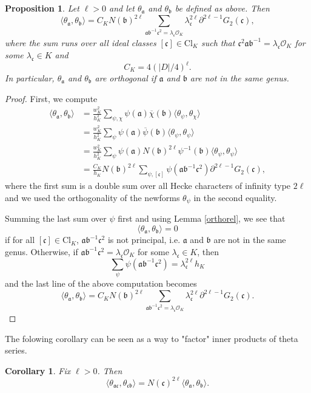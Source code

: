 \documentclass[twoside,10pt]{article}
\newtheorem{prop}{Proposition}
\newtheorem{coro}{Corollary}
\newcommand{\ida}{\mathfrak{a}}
\newcommand{\idb}{\mathfrak{b}}
\newcommand{\idc}{\mathfrak{c}}
\newcommand{\del}{\partial}
\newcommand{\Clk}{\text{Cl}_K}
\renewcommand{\O}{\mathcal{O}}
\newcommand{\tpsi}{\theta_\psi}
\begin{document}
\begin{prop}\label{formula:innerprod}
	Let $\ell>0$ and let $\theta_\ida$ and $\theta_\idb$ be defined as above. Then
	\[\langle\theta_\ida,\theta_\idb\rangle=C_K N(\idb)^{2\ell}\sum_{\ida\idb^{-1}\idc^2=\lambda_\idc\O_K}\lambda_\idc^{2\ell}\del^{2\ell-1}G_2(\idc),\]
	where the sum runs over all ideal classes $[\idc]\in\Clk$ such that $\idc^2\ida\idb^{-1}=\lambda_\idc\O_K$ for some $\lambda_\idc\in K$ and
	 \[C_K=4(|D|/4)^\ell.\]
	 In particular, $\theta_\ida$ and $\theta_\idb$ are orthogonal if $\ida$ and $\idb$ are not in the same genus.
\end{prop}
\begin{proof}
	First, we compute
	\begin{align*}
		\langle\theta_\ida,\theta_\idb\rangle &= \frac{w_K^2}{h_K^2}\sum_{\psi,\chi}\psi(\ida)\overline{\chi}(\idb)\langle\theta_\psi,\theta_\chi\rangle\\
		&= \frac{w_K^2}{h_K^2}\sum_{\psi}\psi(\ida)\overline{\psi}(\idb)\langle\theta_\psi,\theta_\psi\rangle\\
		&= \frac{w_K^2}{h_K^2}\sum_{\psi}\psi(\ida)N(\idb)^{2\ell}\psi^{-1}(\idb)\langle\theta_\psi,\theta_\psi\rangle\\
		&= \frac{C_K}{h_K}N(\idb)^{2\ell}\sum_{\psi,[\idc]}\psi(\ida\idb^{-1}\idc^2)\del^{2\ell-1}G_2(\idc),
	\end{align*}
	where the first sum is a double sum over all Hecke characters of infinity type $2\ell$ and we used the orthogonality of the newforms $\tpsi$ in the second equality.
	
	Summing the last sum over $\psi$ first and using Lemma \ref{orthorel}, we see that
	\[\langle\theta_\ida,\theta_\idb\rangle=0\]
	if for all $[\idc]\in\Clk$, $\ida\idb^{-1}\idc^2$ is not principal, i.e. $\ida$ and $\idb$ are not in the same genus. Otherwise, if $\ida\idb^{-1}\idc^2=\lambda_\idc\O_K$ for some $\lambda_\idc\in K$, then
	\[\sum_{\psi}\psi(\ida\idb^{-1}\idc^2)=\lambda_\idc^{2\ell} h_K\]
	and the last line of the above computation becomes
	\[\langle\theta_\ida,\theta_\idb\rangle=C_K N(\idb)^{2\ell}\sum_{\ida\idb^{-1}\idc^2=\lambda_\idc\O_K}\lambda_\idc^{2\ell}\del^{2\ell-1}G_2(\idc).\]
\end{proof}

The folowing corollary can be seen as a way to "factor" inner products of theta series.

\begin{coro}\label{coro:factorpip}
	Fix $\ell>0$. Then
	\[\langle\theta_{\ida\idc},\theta_{\idc\idb}\rangle=N(\idc)^{2\ell}\langle\theta_{\ida},\theta_{\idb}\rangle.\]
\end{coro}
\end{document}
